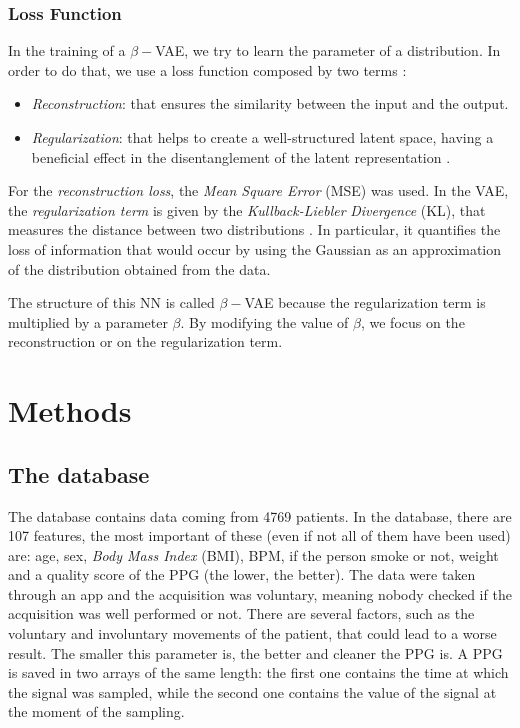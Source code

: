 \documentclass[12pt,a4paper,twocolumn]{article}
\begin{document}
		\subsubsection{Loss Function}
			In the training of a $\beta-$VAE, we try to learn the parameter of a distribution. In order to do that, we use a loss function composed by two terms \cite{9244048}:
			\begin{itemize}
				\item \emph{Reconstruction}: that ensures the similarity between the input and the output.
				\item \emph{Regularization}: that helps to create a well-structured latent space, having a beneficial effect in the disentanglement of the latent representation \cite{9244048}.
			\end{itemize}
			For the \emph{reconstruction loss}, the \emph{Mean Square Error} (MSE) was used.
			In the VAE, the \emph{regularization term} is given by the \emph{Kullback-Liebler} \emph{Divergence} (KL), that measures the distance between two distributions \cite{KL}. In particular, it quantifies the loss of information that would occur by using the Gaussian as an approximation of the distribution obtained from the data.
			
			The structure of this NN is called $\beta-$VAE because the regularization term is multiplied by a parameter $\beta$. By modifying the value of $\beta$, we focus on the reconstruction or on the regularization term.

		\section{Methods}
		\subsection{The database}
			The database \cite{database} contains data coming from 4769 patients. In the database, there are 107 features, the most important of these (even if not all of them have been used) are: age, sex, \emph{Body Mass Index} (BMI), BPM, if the person smoke or not,  weight and a quality score of the PPG (the lower, the better). The data were taken through an app and the acquisition was voluntary, meaning nobody checked if the acquisition was well performed or not. There are several factors, such as the voluntary and involuntary movements of the patient, that could lead to a worse result. 
			The smaller this parameter  is, the better and cleaner the PPG is. A PPG is saved in two arrays of the same length: the first one contains the time at which the signal was sampled, while the second one contains the value of the signal at the moment of the sampling.
			
\end{document}
